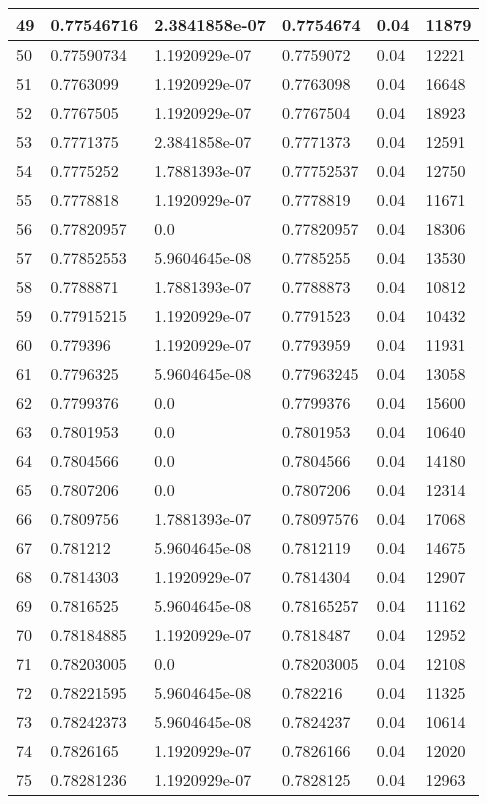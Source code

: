 \begin{longtable}{|l|l|l|l|l|l|}
49 & 0.77546716 & 2.3841858e-07 & 0.7754674 & 0.04 & 11879 \\ \hline 
50 & 0.77590734 & 1.1920929e-07 & 0.7759072 & 0.04 & 12221 \\ \hline 
51 & 0.7763099 & 1.1920929e-07 & 0.7763098 & 0.04 & 16648 \\ \hline 
52 & 0.7767505 & 1.1920929e-07 & 0.7767504 & 0.04 & 18923 \\ \hline 
53 & 0.7771375 & 2.3841858e-07 & 0.7771373 & 0.04 & 12591 \\ \hline 
54 & 0.7775252 & 1.7881393e-07 & 0.77752537 & 0.04 & 12750 \\ \hline 
55 & 0.7778818 & 1.1920929e-07 & 0.7778819 & 0.04 & 11671 \\ \hline 
56 & 0.77820957 & 0.0 & 0.77820957 & 0.04 & 18306 \\ \hline 
57 & 0.77852553 & 5.9604645e-08 & 0.7785255 & 0.04 & 13530 \\ \hline 
58 & 0.7788871 & 1.7881393e-07 & 0.7788873 & 0.04 & 10812 \\ \hline 
59 & 0.77915215 & 1.1920929e-07 & 0.7791523 & 0.04 & 10432 \\ \hline 
60 & 0.779396 & 1.1920929e-07 & 0.7793959 & 0.04 & 11931 \\ \hline 
61 & 0.7796325 & 5.9604645e-08 & 0.77963245 & 0.04 & 13058 \\ \hline 
62 & 0.7799376 & 0.0 & 0.7799376 & 0.04 & 15600 \\ \hline 
63 & 0.7801953 & 0.0 & 0.7801953 & 0.04 & 10640 \\ \hline 
64 & 0.7804566 & 0.0 & 0.7804566 & 0.04 & 14180 \\ \hline 
65 & 0.7807206 & 0.0 & 0.7807206 & 0.04 & 12314 \\ \hline 
66 & 0.7809756 & 1.7881393e-07 & 0.78097576 & 0.04 & 17068 \\ \hline 
67 & 0.781212 & 5.9604645e-08 & 0.7812119 & 0.04 & 14675 \\ \hline 
68 & 0.7814303 & 1.1920929e-07 & 0.7814304 & 0.04 & 12907 \\ \hline 
69 & 0.7816525 & 5.9604645e-08 & 0.78165257 & 0.04 & 11162 \\ \hline 
70 & 0.78184885 & 1.1920929e-07 & 0.7818487 & 0.04 & 12952 \\ \hline 
71 & 0.78203005 & 0.0 & 0.78203005 & 0.04 & 12108 \\ \hline 
72 & 0.78221595 & 5.9604645e-08 & 0.782216 & 0.04 & 11325 \\ \hline 
73 & 0.78242373 & 5.9604645e-08 & 0.7824237 & 0.04 & 10614 \\ \hline 
74 & 0.7826165 & 1.1920929e-07 & 0.7826166 & 0.04 & 12020 \\ \hline 
75 & 0.78281236 & 1.1920929e-07 & 0.7828125 & 0.04 & 12963 \\ \hline 
\end{longtable}